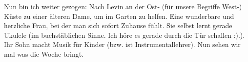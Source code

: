 Nun bin ich weiter gezogen: Nach Levin an der Ost- (für unsere Begriffe
West-) Küste zu einer älteren Dame, um im Garten zu helfen. Eine
wunderbare und herzliche Frau, bei der man sich sofort Zuhause fühlt.
Sie selbst lernt gerade Ukulele (im buchstäblichen Sinne. Ich höre es
gerade durch die Tür schallen :).). Ihr Sohn macht Musik für Kinder
(bzw. ist Instrumentallehrer). Nun sehen wir mal was die Woche bringt.

